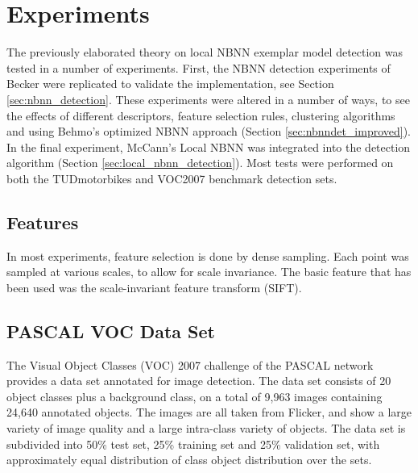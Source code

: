 \section{Experiments} %
\label{cha:experimental_setup}

The previously elaborated theory on local NBNN exemplar model detection was tested in a number of experiments. First, the NBNN detection experiments of Becker \cite{becker2012codebook} were replicated to validate the implementation, see Section \ref{sec:nbnn_detection}. These experiments were altered in a number of ways, to see the effects of different descriptors, feature selection rules, clustering algorithms and using Behmo's optimized NBNN approach (Section \ref{sec:nbnndet_improved}). In the final experiment, McCann's Local NBNN was integrated into the detection algorithm (Section \ref{sec:local_nbnn_detection}). Most tests were performed on both the TUDmotorbikes and VOC2007 benchmark detection sets.

\subsection{Features} %
\label{sec:features}

In most experiments, feature selection is done by dense sampling. Each point was sampled at various scales, to allow for scale invariance. The basic feature that has been used was the scale-invariant feature transform (SIFT). \cite{lowe2004distinctive}



\subsection{PASCAL VOC Data Set} %

\label{sec:voc_data_set}
The Visual Object Classes (VOC) 2007 challenge of the PASCAL network \cite{pascal-voc-2007} provides a data set annotated for image detection. The data set consists of 20 object classes plus a background class, on a total of 9,963 images containing 24,640 annotated objects. The images are all taken from Flicker, and show a large variety of image quality and a large intra-class variety of objects. The data set is subdivided into 50\% test set, 25\% training set and 25\% validation set, with approximately equal distribution of class object distribution over the sets.

